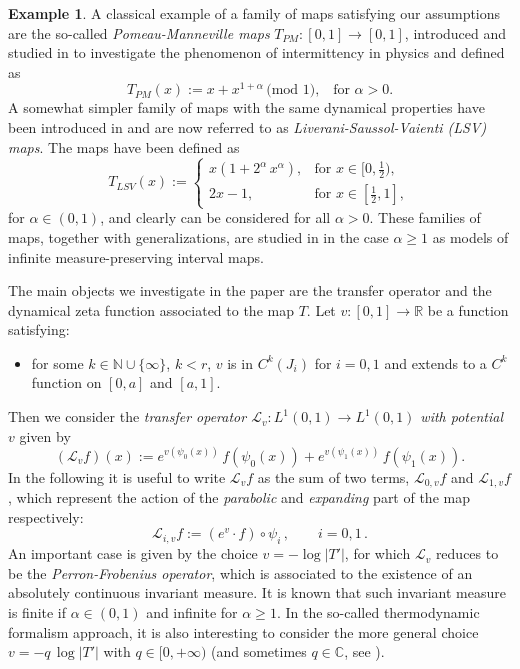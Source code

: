 \documentclass[11pt]{amsart}
\theoremstyle{definition}
\theoremstyle{remark}
\theoremstyle{definition}
\newtheorem{example}[theorem]{Example}
\numberwithin{equation}{section}
\newcommand{\R}{\mathbb R}
\newcommand{\N}{\mathbb N}
\newcommand{\C}{\mathbb C}
\newcommand{\LL}{\mathcal{L}}
\begin{document}
\begin{example}
A classical example of a family of maps satisfying our assumptions are the so-called \emph{Pomeau-Manneville maps} $T_{PM}:[0,1]\to [0,1]$, introduced and studied in \cite{M,PM} to investigate the phenomenon of intermittency in physics and defined as
\[
T_{PM}(x) := x + x^{1+\alpha} \, \text{(mod $1$),} \quad \text{for $\alpha>0$.}
\]
A somewhat simpler family of maps with the same dynamical properties have been introduced in \cite{LSV} and are now referred to as \emph{Liverani-Saussol-Vaienti (LSV) maps}. The maps have been defined as
\[
T_{LSV}(x):=\begin{cases}
x(1+2^\alpha\, x^{\alpha}), & \text{for $x\in [0, \frac 12)$,}\\[0.1cm]
2x-1, & \text{for $x\in [\frac 12, 1]$},
\end{cases}
\]
for $\alpha\in (0,1)$, and clearly can be considered for all $\alpha>0$. These families of maps, together with generalizations, are studied in \cite{BL} in the case $\alpha\ge 1$ as models of infinite measure-preserving interval maps.
\end{example}

The main objects we investigate in the paper are the transfer operator and the dynamical zeta function associated to the map $T$.
Let $v:[0,1] \to \R$ be a function satisfying:
\begin{itemize}
\item[(H6)] for some $k\in \N \cup \{\infty\}$, $k< r$, $v$ is in $C^k(J_i)$ for $i=0,1$ and extends to a $C^k$ function on $[0,a]$ and $[a,1]$.
\end{itemize}
Then we consider the \emph{transfer operator $\LL_v : L^1(0,1)\to L^1(0,1)$ with potential $v$} given by 
\[
(\LL_v f) (x) := e^{v(\psi_0(x))}\, f(\psi_0(x)) + e^{v(\psi_1(x))}\, f(\psi_1(x)).
\]
In the following it is useful to write $\LL_v f$ as the sum of two terms, $\LL_{0,v} f$ and $\LL_{1,v} f$, which represent the action of the \emph{parabolic} and \emph{expanding} part of the map respectively:
\begin{equation}\label{notat-L0L1}
\LL_{i,v} f := (e^v\cdot f) \circ \psi_i\, , \qquad i=0,1\, .
\end{equation}
An important case is given by the choice $v = - \log |T'|$, for which $\LL_v$ reduces to be the \emph{Perron-Frobenius operator}, which is associated to the existence of an absolutely continuous invariant measure. It is known that such invariant measure is finite if $\alpha\in (0,1)$ and infinite for $\alpha \ge 1$. In the so-called thermodynamic formalism approach, it is also interesting to consider the more general choice $v = -q\, \log |T'|$ with $q\in [0,+\infty)$ (and sometimes $q\in \C$, see \cite{BI}). \\
\end{document}
